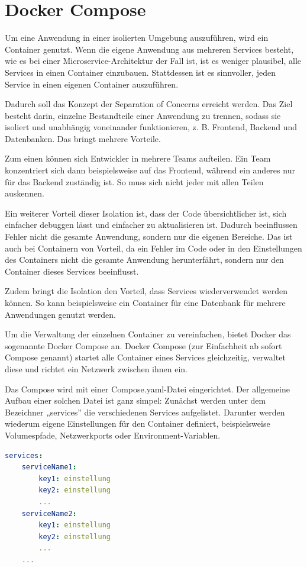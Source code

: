 \section{Docker Compose}
Um eine Anwendung in einer isolierten Umgebung auszuführen, wird ein Container genutzt.
Wenn die eigene Anwendung aus mehreren Services besteht, wie es bei einer Microservice-Architektur der Fall ist, ist es weniger plausibel, alle Services in einen Container einzubauen. Stattdessen ist es sinnvoller, jeden Service in einen eigenen Container auszuführen.

Dadurch soll das Konzept der Separation of Concerns erreicht werden. 
Das Ziel besteht darin, einzelne Bestandteile einer Anwendung zu trennen, sodass sie isoliert und unabhängig voneinander funktionieren, z. B. Frontend, Backend und Datenbanken. Das bringt mehrere Vorteile.

Zum einen können sich Entwickler in mehrere Teams aufteilen. Ein Team konzentriert sich dann beispielsweise auf das Frontend, während ein anderes nur für das Backend zuständig ist. 
So muss sich nicht jeder mit allen Teilen auskennen.

Ein weiterer Vorteil dieser Isolation ist, dass der Code übersichtlicher ist, sich einfacher debuggen lässt und einfacher zu aktualisieren ist.
Dadurch beeinflussen Fehler nicht die gesamte Anwendung, sondern nur die eigenen Bereiche. Das ist auch bei Containern von Vorteil, da ein Fehler im Code oder in den Einstellungen des Containers nicht die gesamte Anwendung herunterfährt, sondern nur den Container dieses Services beeinflusst.

Zudem bringt die Isolation den Vorteil, dass Services wiederverwendet werden können. So kann beispielsweise ein Container für eine Datenbank für mehrere Anwendungen genutzt werden.

Um die Verwaltung der einzelnen Container zu vereinfachen, bietet Docker das sogenannte Docker Compose an.
Docker Compose (zur Einfachheit ab sofort Compose genannt) startet alle Container eines Services gleichzeitig, verwaltet diese und richtet ein Netzwerk zwischen ihnen ein.

Das Compose wird mit einer Compose.yaml-Datei eingerichtet.
Der allgemeine Aufbau einer solchen Datei ist ganz simpel: Zunächst werden unter dem Bezeichner „services” die verschiedenen Services aufgelistet. 
Darunter werden wiederum eigene Einstellungen für den Container definiert, beispielsweise Volumespfade, Netzwerkports oder Environment-Variablen.

\begin{lstlisting}[language=yaml, caption={Beispiel einer compose.yaml Datei}]
services:
    serviceName1:
        key1: einstellung
        key2: einstellung
        ...
    serviceName2:
        key1: einstellung
        key2: einstellung
        ... 
    ...
\end{lstlisting}

